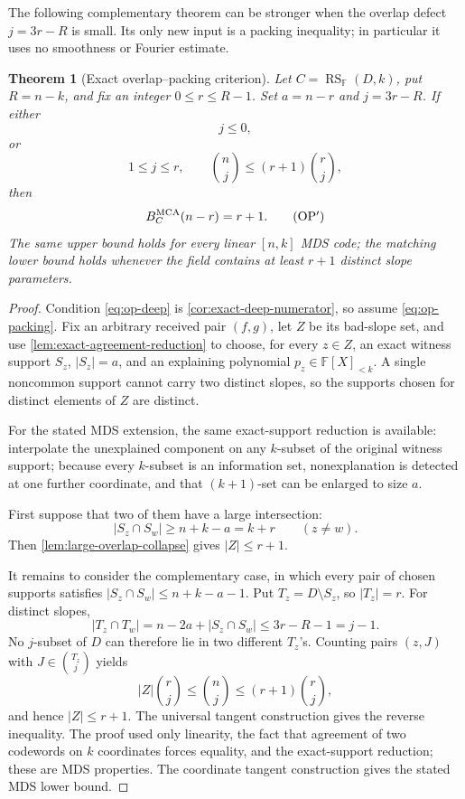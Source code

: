 \documentclass[11pt,a4paper]{amsart}
\numberwithin{equation}{section}
\newtheorem{theorem}{Theorem}[section]
\theoremstyle{remark}
\DeclareMathOperator{\RS}{RS}
\newcommand{\F}{\mathbb F}
\newcommand{\abs}[1]{\lvert #1\rvert}
\begin{document}
The following complementary theorem can be stronger when the overlap
defect \(j=3r-R\) is small.  Its only new input is a packing inequality;
in particular it uses no smoothness or Fourier estimate.

\begin{theorem}[Exact overlap--packing criterion]
\label{thm:overlap-packing-exact}
Let \(C=\RS_\F(D,k)\), put \(R=n-k\), and fix an integer
\(0\le r\le R-1\).  Set \(a=n-r\) and \(j=3r-R\).  If either
\[
 j\le0,
 \tag{OP0}\label{eq:op-deep}
\]
or
\[
 1\le j\le r,
 \qquad
 \binom nj\le(r+1)\binom rj,
 \tag{OP}\label{eq:op-packing}
\]
then
\[
                    B_C^{\rm MCA}(n-r)=r+1.       \tag{OP$'$}
\label{eq:op-exact}
\]
The same upper bound holds for every linear \([n,k]\) MDS code; the
matching lower bound holds whenever the field contains at least \(r+1\)
distinct slope parameters.
\end{theorem}

\begin{proof}
Condition \eqref{eq:op-deep} is
\cref{cor:exact-deep-numerator}, so assume
\eqref{eq:op-packing}.  Fix an arbitrary received pair \((f,g)\), let
\(Z\) be its bad-slope set, and use
\cref{lem:exact-agreement-reduction} to choose, for every \(z\in Z\), an
exact witness support \(S_z\), \(\abs{S_z}=a\), and an explaining
polynomial \(p_z\in\F[X]_{<k}\).  A single noncommon support cannot carry
two distinct slopes, so the supports chosen for distinct elements of
\(Z\) are distinct.

For the stated MDS extension, the same exact-support reduction is
available: interpolate the unexplained component on any \(k\)-subset of
the original witness support; because every \(k\)-subset is an information
set, nonexplanation is detected at one further coordinate, and that
\((k+1)\)-set can be enlarged to size \(a\).

First suppose that two of them have a large intersection:
\[
 \abs{S_z\cap S_w}\ge n+k-a=k+r
 \qquad(z\ne w).
 \tag{OP1}\label{eq:op-large-overlap}
\]
Then \cref{lem:large-overlap-collapse} gives \(\abs Z\le r+1\).

It remains to consider the complementary case, in which every pair of
chosen supports satisfies
\(\abs{S_z\cap S_w}\le n+k-a-1\).  Put
\(T_z=D\setminus S_z\), so \(\abs{T_z}=r\).  For distinct slopes,
\[
 \abs{T_z\cap T_w}
 =n-2a+\abs{S_z\cap S_w}
 \le3r-R-1=j-1.                                  \tag{OP3}
\label{eq:op-small-overlap}
\]
No \(j\)-subset of \(D\) can therefore lie in two different \(T_z\)'s.
Counting pairs \((z,J)\) with \(J\in\binom{T_z}{j}\) yields
\[
                 \abs Z\binom rj\le\binom nj\le
                 (r+1)\binom rj,
\]
and hence \(\abs Z\le r+1\).  The universal tangent construction gives
the reverse inequality.  The proof used only linearity, the fact that
agreement of two codewords on \(k\) coordinates forces equality, and the
exact-support reduction; these are MDS properties.  The coordinate
tangent construction gives the stated MDS lower bound.
\end{proof}
\end{document}
